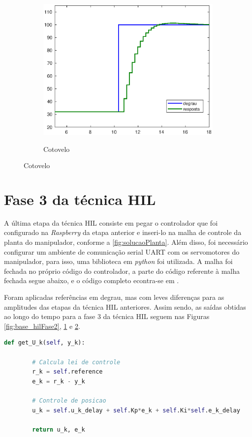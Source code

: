 \begin{figure}[h!]
\begin{subfigure}{.5\textwidth}
    \label{fig:shoulder_hilFase2}
  \end{subfigure}%
  \\[5ex]
  \begin{subfigure}{\textwidth}
    \centering
    \caption{Cotovelo}
    \includegraphics[width = 0.55\columnwidth]{Imagens/forearm_hilFase2}
    \label{fig:forearm_hilFase2}
  \end{subfigure}%
  
  \label{fig:hilFase2} 

\end{figure}

\section{Fase 3 da técnica HIL}

A última etapa da técnica HIL consiste em pegar o controlador que foi configurado
na \textit{Raspberry} da etapa anterior e inseri-lo na malha de controle da planta do
manipulador, conforme a \autoref{fig:solucaoPlanta}. Além disso, foi necessário configurar
um ambiente de comunicação serial UART com os servomotores do manipulador, para isso, uma
biblioteca em \textit{python} foi utilizada. A malha foi fechada no próprio código do 
controlador, a parte do código referente à malha fechada segue abaixo, e o código completo
econtra-se em \cite{lelis_hil3}.

Foram aplicadas referências em degrau, mas com leves diferenças para as amplitudes
das etapas da técnica HIL anteriores. Assim sendo, as saídas obtidas ao longo do 
tempo para a fase 3 da técnica HIL seguem nas Figuras \ref{fig:base_hilFase2}, 
\ref{fig:shoulder_hilFase2} e \ref{fig:forearm_hilFase2}. \\

\begin{lstlisting}[language=Python]
	def get_U_k(self, y_k):
		
		# Calcula lei de controle
		r_k = self.reference
		e_k = r_k - y_k

		# Controle de posicao
		u_k = self.u_k_delay + self.Kp*e_k + self.Ki*self.e_k_delay
			
		return u_k, e_k
\end{lstlisting}

